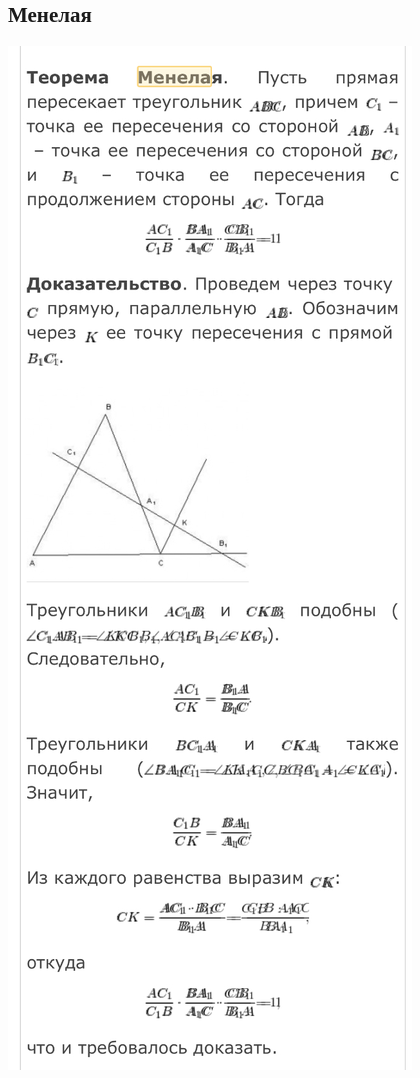 \documentclass[12pt, letterpaper]{article}
\begin{document}
\subsection{Менелая}
\includegraphics[scale=0.3]{solve30.jpg}\\
\end{document}
